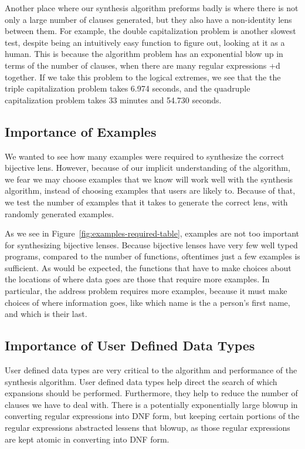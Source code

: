 Another place where our synthesis algorithm preforms badly is where there is not
only a large number of clauses generated, but they also have a non-identity
lens between them.
For example, the double capitalization problem is another slowest test, despite
being an intuitively easy function to figure out, looking at it as a human.
This is because the algorithm problem has an exponential blow up in terms
of the number of clauses, when there are many regular expressions +d together.
If we take this problem to the logical extremes, we see that the the triple
capitalization problem takes 6.974 seconds, and the quadruple capitalization
problem takes 33 minutes and 54.730 seconds.

\subsection{Importance of Examples}
We wanted to see how many examples were required to synthesize the correct
bijective lens.
However, because of our implicit understanding of the algorithm, we fear we may
choose examples that we know will work well with the synthesis algorithm,
instead of choosing examples that users are likely to.
Because of that, we test the number of examples that it takes to generate the
correct lens, with randomly generated examples.


As we see in Figure~\ref{fig:examples-required-table}, examples are not too
important for synthesizing bijective lenses.
Because bijective lenses have very few well typed programs, compared to the
number of functions, oftentimes just a few examples is sufficient.
As would be expected, the functions that have to make choices about the
locations of where data goes are those that require more examples.
In particular, the address problem requires more examples, because it must make
choices of where information goes, like which name is the a person's first name,
and which is their last.

\subsection{Importance of User Defined Data Types}

User defined data types are very critical to the algorithm and performance of
the synthesis algorithm.  User defined data types help direct the search of
which expansions should be performed.  Furthermore, they help to reduce the
number of clauses we have to deal with.  There is a potentially exponentially
large blowup in converting regular expressions into DNF form, but keeping
certain portions of the regular expressions abstracted lessens that blowup,
as those regular expressions are kept atomic in converting into DNF form.

